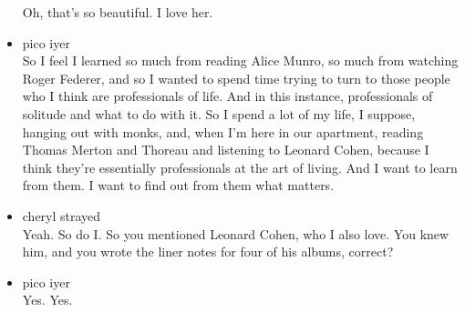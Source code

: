 \begin{itemize}
  Oh, that's so beautiful. I love her.
\item
  pico iyer\\
  So I feel I learned so much from reading Alice Munro, so much from
  watching Roger Federer, and so I wanted to spend time trying to turn
  to those people who I think are professionals of life. And in this
  instance, professionals of solitude and what to do with it. So I spend
  a lot of my life, I suppose, hanging out with monks, and, when I'm
  here in our apartment, reading Thomas Merton and Thoreau and listening
  to Leonard Cohen, because I think they're essentially professionals at
  the art of living. And I want to learn from them. I want to find out
  from them what matters.
\item
  cheryl strayed\\
  Yeah. So do I. So you mentioned Leonard Cohen, who I also love. You
  knew him, and you wrote the liner notes for four of his albums,
  correct?
\item
  pico iyer\\
  Yes. Yes.


\end{itemize}
